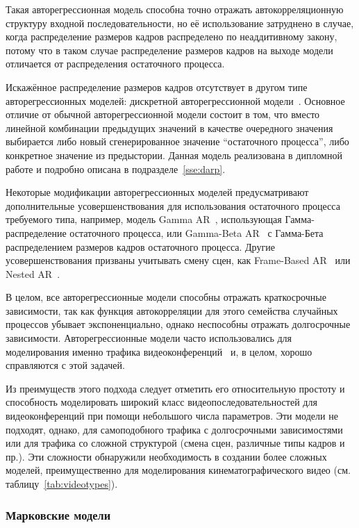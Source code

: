 Такая авторегрессионная модель способна точно отражать автокорреляционную структуру
входной последовательности, но её использование затруднено в случае, когда
распределение размеров кадров распределено по неаддитивному закону, потому что
в таком случае распределение размеров кадров на выходе модели отличается
от распределения остаточного процесса.

Искажённое распределение размеров кадров отсутствует в другом типе
авторегрессионных моделей: дискретной авторегрессионной модели~\cite{heymanATM}.
Основное отличие от обычной авторегрессионной модели состоит
в том, что вместо линейной комбинации предыдущих значений
в качестве очередного значения выбирается либо новый сгенерированное
значение ``остаточного процесса'', либо конкретное значение из предыстории.
Данная модель реализована в дипломной работе и подробно описана в
подразделе~\ref{sse:darp}.

Некоторые модификации авторегрессионных моделей предусматривают
дополнительные усовершенствования для использования остаточного
процесса требуемого типа, например, модель Gamma AR~\cite{gar},
использующая Гамма-распределение остаточного процесса, или
Gamma-Beta AR~\cite{gbar} с Гамма-Бета распределением размеров
кадров остаточного процесса. Другие усовершенствования призваны
учитывать смену сцен, как Frame-Based AR~\cite{Krunz95atraffic}
или Nested AR~\cite{nestedar}.

В целом, все авторегрессионные модели способны отражать краткосрочные
зависимости, так как функция автокорреляции для этого семейства
случайных процессов убывает экспоненциально, однако неспособны
отражать долгосрочные зависимости. Авторегрессионные модели
часто использовались для моделирования именно трафика видеоконференций~\cite{ars2004}
и, в целом, хорошо справляются с этой задачей.

Из преимуществ этого подхода следует отметить его относительную простоту
и способность моделировать широкий класс видеопоследовательностей
для видеоконференций при помощи небольшого числа параметров.
Эти модели не подходят, однако, для самоподобного трафика с
долгосрочными зависимостями или для трафика со сложной структурой
(смена сцен, различные типы кадров и пр.). Эти сложности
обнаружили необходимость в создании более сложных моделей,
преимущественно для моделирования кинематографического видео
(см. таблицу~\ref{tab:videotypes}).

\subsubsection{Марковские модели}
\hspace{3pt}

